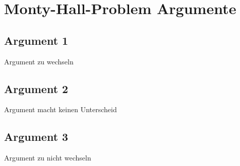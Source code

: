 \chapter{Monty-Hall-Problem Argumente}

    \section{Argument 1}
    Argument zu wechseln

    \section{Argument 2}
    Argument macht keinen Unterscheid

    \section{Argument 3}
    Argument zu nicht wechseln
